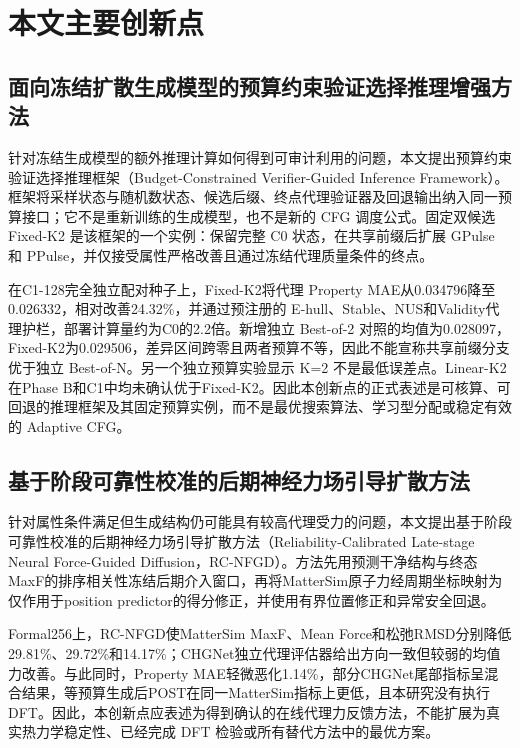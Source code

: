\section{本文主要创新点}

\subsection{面向冻结扩散生成模型的预算约束验证选择推理增强方法}

针对冻结生成模型的额外推理计算如何得到可审计利用的问题，本文提出预算约束验证选择推理框架（Budget-Constrained Verifier-Guided Inference Framework）。框架将采样状态与随机数状态、候选后缀、终点代理验证器及回退输出纳入同一预算接口；它不是重新训练的生成模型，也不是新的 CFG 调度公式。固定双候选 Fixed-K2 是该框架的一个实例：保留完整 C0 状态，在共享前缀后扩展 GPulse 和 PPulse，并仅接受属性严格改善且通过冻结代理质量条件的终点。

在C1-128完全独立配对种子上，Fixed-K2将代理 Property MAE从0.034796降至0.026332，相对改善24.32\%，并通过预注册的 E-hull、Stable、NUS和Validity代理护栏，部署计算量约为C0的2.2倍。新增独立 Best-of-2 对照的均值为0.028097，Fixed-K2为0.029506，差异区间跨零且两者预算不等，因此不能宣称共享前缀分支优于独立 Best-of-N。另一个独立预算实验显示 K=2 不是最低误差点。Linear-K2在Phase B和C1中均未确认优于Fixed-K2。因此本创新点的正式表述是可核算、可回退的推理框架及其固定预算实例，而不是最优搜索算法、学习型分配或稳定有效的 Adaptive CFG。

\subsection{基于阶段可靠性校准的后期神经力场引导扩散方法}

针对属性条件满足但生成结构仍可能具有较高代理受力的问题，本文提出基于阶段可靠性校准的后期神经力场引导扩散方法（Reliability-Calibrated Late-stage Neural Force-Guided Diffusion，RC-NFGD）。方法先用预测干净结构与终态 MaxF的排序相关性冻结后期介入窗口，再将Matter\allowbreak Sim原子力经周期坐标映射为仅作用于position predictor的得分修正，并使用有界位置修正和异常安全回退。

Formal256上，RC-NFGD使Matter\allowbreak Sim MaxF、Mean Force和松弛RMSD分别降低29.81\%、29.72\%和14.17\%；CHGNet独立代理评估器给出方向一致但较弱的均值力改善。与此同时，Property MAE轻微恶化1.14\%，部分CHGNet尾部指标呈混合结果，等预算生成后POST在同一Matter\allowbreak Sim指标上更低，且本研究没有执行DFT。因此，本创新点应表述为得到确认的在线代理力反馈方法，不能扩展为真实热力学稳定性、已经完成 DFT 检验或所有替代方法中的最优方案。

